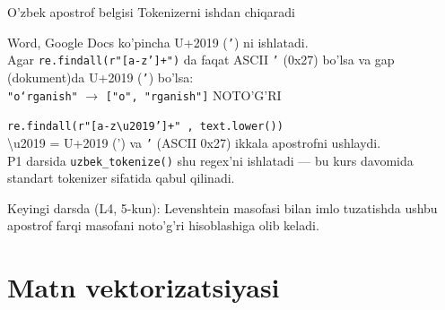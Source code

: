 \documentclass[aspectratio=169,11pt]{beamer}
\begin{document}
\begin{frame}{O'zbek apostrof belgisi Tokenizerni ishdan chiqaradi}
  \begin{tcolorbox}[warnbox,title=Haqiqiy xato --- amaliyotda tez-tez uchraydi]
    \small
    Word, Google Docs ko'pincha U+2019 (\texttt{'}) ni ishlatadi.\\[3pt]
    Agar \texttt{re.findall(r"[a-z']+")} da faqat ASCII \texttt{'} (0x27) bo'lsa
    va gap (dokument)da U+2019 (\texttt{'}) bo'lsa:\\[3pt]
    \texttt{"o\textquoteleft{}rganish"} $\to$ \texttt{["o", "rganish"]}
    \quad\alert{NOTO'G'RI}
  \end{tcolorbox}
  \vspace{4pt}
  \begin{tcolorbox}[okbox,title=Yechim: ikkala Unicode belgisini qo'llang]
    \small
    \texttt{re.findall(r"[a-z\textbackslash{}u2019']+" , text.lower())}\\[4pt]
    \footnotesize
    \textbackslash{}u2019 = U+2019 (') va \texttt{'} (ASCII 0x27) ikkala apostrofni ushlaydi.\\[3pt]
    P1 darsida \texttt{uzbek\_tokenize()} shu regex'ni ishlatadi ---
    bu kurs davomida standart tokenizer sifatida qabul qilinadi.
  \end{tcolorbox}
  \vspace{4pt}
  \footnotesize\color{halfgray}
  Keyingi darsda (L4, 5-kun): Levenshtein masofasi bilan imlo tuzatishda
  ushbu apostrof farqi masofani noto'g'ri hisoblashiga olib keladi.
\end{frame}

\section[BoW va TF-IDF]{Matn vektorizatsiyasi}
\end{document}
